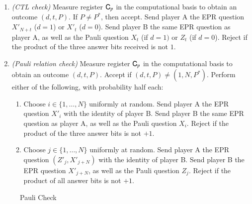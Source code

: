\begin{center}
\begin{mdframed}
\begin{enumerate}
\item \emph{(CTL check)} Measure register ${\textsf{C}}_{p}$ in the computational basis to obtain an outcome $(d,t,P)$. If $P \neq P^*$, then accept. Send player A the EPR question $X'_{N+t}$ ($d=1$) or $X'_t$ ($d=0$).  Send player B the same EPR question as player A, as well as the Pauli question $X_t$ (if $d=1)$ or $Z_t$ (if $d=0$).  Reject if the product of the three answer bits received is not $1$.

\item{\emph{(Pauli relation check)}} Measure register ${\textsf{C}}_p$  in the computational basis to obtain an outcome $(d,t,P)$. Accept if $(d,t,P)\neq (1,N,P^*)$. Perform either of the following, with probability half each:
\begin{enumerate}
\item Choose $i\in\{1,\ldots,N\}$ uniformly at random. Send player A the EPR question $X'_i$ with the identity of player B. Send player B the same EPR question as player A, as well as the Pauli question $X_i$. Reject if the product of the three answer bits is not $+1$. 
\item Choose $j\in\{1,\ldots,N\}$ uniformly at random. Send player A the EPR question $(Z'_j,X'_{j+N})$  with the identity of player B. Send player B the EPR question $X'_{j+N}$, as well as the Pauli question $Z_j$. Reject if the product of all answer bits is not $+1$. 
\end{enumerate}
	\end{enumerate}    
\end{mdframed}
\end{center}
\begin{figure}[H]
\caption{Pauli Check}
\label{fig:pauli_check}
\end{figure}


